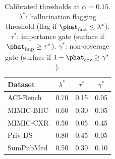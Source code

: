 \begin{table}[h]
\centering
\small
\caption{Calibrated thresholds at $\alpha=0.15$. $\lambda^*$: hallucination flagging threshold (flag if $\phat_{\mathrm{fact}} \le \lambda^*$). $\tau^*$: importance gate (surface if $\phat_{\mathrm{imp}} \ge \tau^*$). $\gamma^*$: non-coverage gate (surface if $1 - \phat_{\mathrm{cov}} \ge \gamma^*$).}
\label{tab:thresholds}
\begin{tabular}{l ccc}
\toprule
Dataset & $\lambda^*$ & $\tau^*$ & $\gamma^*$ \\
\midrule
ACI-Bench      & 0.70 & 0.15 & 0.05 \\
MIMIC-BHC      & 0.60 & 0.30 & 0.05 \\
MIMIC-CXR      & 0.50 & 0.05 & 0.45 \\
Priv-DS        & 0.80 & 0.45 & 0.05 \\
SumPubMed      & 0.50 & 0.30 & 0.10 \\
\bottomrule
\end{tabular}
\end{table}